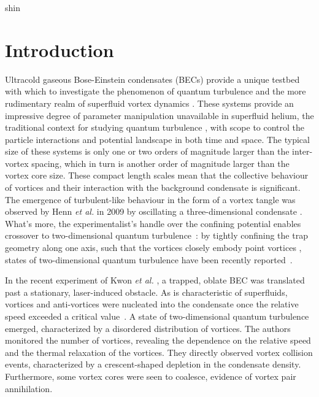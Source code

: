 \begin{chapter}{\label{cha:shin}shin}
\newcommand{\gws}[1]{\textcolor{blue}{#1}}
\newcommand{\ngp}[1]{#1}%
\newcommand{\etal}{{\it et al.}~}
\newcommand{\etalcc}{{\it et al.}}
\newcommand{\boldell}{{\mbox{\boldmath $\ell$}}}
\newcommand{\intr}{\int d \mathbf{r}}
\newcommand{\bfrt}{({\bf{r}},t)}
\newcommand{\fprt}{f({\mathbf{p}}, {\mathbf{r}},t)}

\section{Introduction}
Ultracold gaseous Bose-Einstein condensates (BECs) provide a unique testbed with which to investigate the phenomenon of quantum turbulence and the more rudimentary realm of superfluid vortex dynamics \citep{white_anderson_14,barenghi_skrbek_14}.  These systems provide an impressive degree of parameter manipulation unavailable in superfluid helium, the traditional context for studying quantum turbulence \citep{barenghi_donnelly_01}, with scope to control the particle interactions and potential landscape in both time and space.  The typical size of these systems is only one or two orders of magnitude larger than the inter-vortex spacing, which in turn is another order of magnitude larger than the vortex core size.  These compact length scales mean that the collective behaviour of vortices and their interaction with the background condensate is significant.  The emergence of turbulent-like behaviour in the form of a vortex tangle was observed by Henn {\it et al.} in 2009 by oscillating a three-dimensional condensate \cite{henn_seman_09}.  What's more, the experimentalist's handle over the confining potential enables crossover to two-dimensional quantum turbulence~\cite{parker2005}: by tightly confining the trap geometry along one axis, such that the vortices closely embody point vortices \cite{middelkamp}, states of two-dimensional quantum turbulence have been recently reported~\citep{neely_bradley_13,kwon_moon_14}.

In the recent experiment of Kwon {\it et al.} \citep{kwon_moon_14}, a trapped, oblate BEC was translated past a stationary, laser-induced obstacle.  As is characteristic of superfluids, vortices and anti-vortices were nucleated into the condensate once the relative speed exceeded a critical value~\cite{frisch_92}.  \ngp{A state of two-dimensional quantum turbulence emerged, characterized by a disordered distribution of vortices.}  The authors monitored the number of vortices, revealing the dependence on the relative speed and the thermal relaxation of the vortices.  They directly observed vortex collision events, characterized by a crescent-shaped depletion in the condensate density. Furthermore, some vortex cores were seen to coalesce, evidence of vortex pair annihilation.


\end{chapter}
